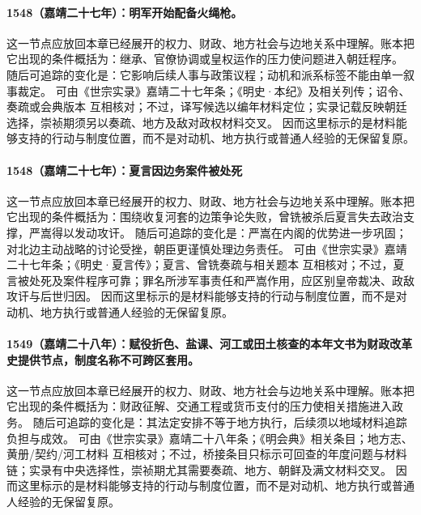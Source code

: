 \paragraph{1548（嘉靖二十七年）：明军开始配备火绳枪。} 这一节点应放回本章已经展开的权力、财政、地方社会与边地关系中理解。账本把它出现的条件概括为：继承、官僚协调或皇权运作的压力使问题进入朝廷程序。 随后可追踪的变化是：它影响后续人事与政策议程；动机和派系标签不能由单一叙事裁定。 可由《世宗实录》嘉靖二十七年条；《明史·本纪》及相关列传；诏令、奏疏或会典版本 互相核对；不过，译写候选以编年材料定位；实录记载反映朝廷选择，崇祯期须另以奏疏、地方及敌对政权材料交叉。 因而这里标示的是材料能够支持的行动与制度位置，而不是对动机、地方执行或普通人经验的无保留复原。

\paragraph{1548（嘉靖二十七年）：夏言因边务案件被处死} 这一节点应放回本章已经展开的权力、财政、地方社会与边地关系中理解。账本把它出现的条件概括为：围绕收复河套的边策争论失败，曾铣被杀后夏言失去政治支撑，严嵩得以发动攻讦。 随后可追踪的变化是：严嵩在内阁的优势进一步巩固；对北边主动战略的讨论受挫，朝臣更谨慎处理边务责任。 可由《世宗实录》嘉靖二十七年条；《明史·夏言传》；夏言、曾铣奏疏与相关题本 互相核对；不过，夏言被处死及案件程序可靠；罪名所涉军事责任和严嵩作用，应区别皇帝裁决、政敌攻讦与后世归因。 因而这里标示的是材料能够支持的行动与制度位置，而不是对动机、地方执行或普通人经验的无保留复原。

\paragraph{1549（嘉靖二十八年）：赋役折色、盐课、河工或田土核查的本年文书为财政改革史提供节点，制度名称不可跨区套用。} 这一节点应放回本章已经展开的权力、财政、地方社会与边地关系中理解。账本把它出现的条件概括为：财政征解、交通工程或货币支付的压力使相关措施进入政务。 随后可追踪的变化是：其法定安排不等于地方执行，后续须以地域材料追踪负担与成效。 可由《世宗实录》嘉靖二十八年条；《明会典》相关条目；地方志、黄册/契约/河工材料 互相核对；不过，桥接条目只标示可回查的年度问题与材料链；实录有中央选择性，崇祯期尤其需要奏疏、地方、朝鲜及满文材料交叉。 因而这里标示的是材料能够支持的行动与制度位置，而不是对动机、地方执行或普通人经验的无保留复原。

